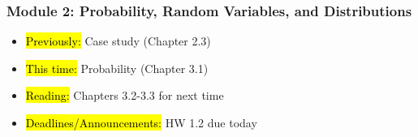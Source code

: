 
\begin{frame}
    \frametitle{Module 2: Probability, Random Variables, and Distributions}
    \begin{itemize}
        \item \hl{Previously: } Case study (Chapter 2.3)
        \item \hl{This time: } Probability (Chapter 3.1)
        \item \hl{Reading: } Chapters 3.2-3.3 for next time
        \item \hl{Deadlines/Announcements: } HW 1.2 due today
    \end{itemize}
    
\end{frame}
    